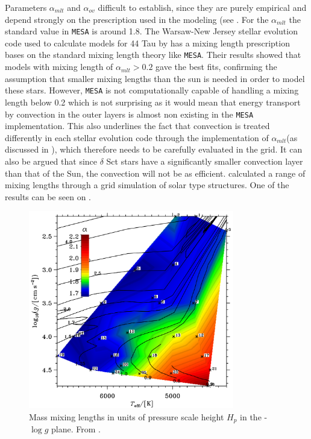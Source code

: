  Parameters $\alpha_{mlt}$ and $\alpha_{ov}$ difficult to establish, since they are purely empirical and depend strongly on the prescription used in the modeling (see . For the $\alpha_{mlt}$ the standard value in \texttt{MESA} is around 1.8. The Warsaw-New Jersey stellar evolution code used to calculate models for 44 Tau by \citet{lenz2010delta} has a mixing length prescription bases on the standard mixing length theory like \texttt{MESA}. Their results showed that models with mixing length of $\alpha_{mlt} > 0.2$ gave the best fits, confirming the assumption that smaller mixing lengths than the sun is needed in order to model these stars. However, \texttt{MESA} is not computationally capable of handling a mixing length below 0.2 which is not surprising as it would mean that energy transport by convection in the outer layers is almost non existing in the  \texttt{MESA} implementation. This also underlines the fact that convection is treated differently in each stellar evolution code through the implementation of $\alpha_{mlt}$(as discussed in ), which therefore needs to be carefully evaluated in the grid. It can also be argued that since $\delta$ Sct stars have a significantly smaller convection layer than that of the Sun, the convection will not be as efficient.  \citet{trampedach2011mass} calculated a range of mixing lengths through a grid simulation of solar type structures. One of the results can be seen on . 

\begin{figure}[htbp]
	\centering
	\includegraphics[width=0.8\textwidth]{tramper.png}
	\caption{Mass mixing lengths in units of pressure scale height $H_p$ in the \teff - $\log g$ plane. From \citep{trampedach2011mass}.}
	\label{tramp}
\end{figure}

